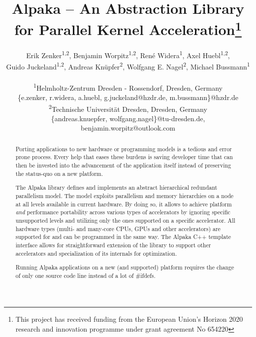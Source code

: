 \documentclass[10pt, twocolumn]{article}
\newcommand{\alpaka}{Alpaka\xspace}
\newcommand\Mark[1]{\textsuperscript#1}
\begin{document}
\title{{\alpaka} -- An Abstraction Library for Parallel Kernel Acceleration\protect\footnote{This project has received funding from the European Union’s Horizon 2020 research and innovation programme under grant agreement No 654220}}

\author{Erik Zenker\Mark{{1,2}}, Benjamin Worpitz\Mark{{1,2}}, Ren\'{e} Widera\Mark{1}, Axel Huebl\Mark{{1,2}},
  \\
  Guido Juckeland\Mark{{1,2}}, Andreas Kn\"{u}pfer\Mark{2}, Wolfgang E. Nagel\Mark{2}, Michael Bussmann\Mark{1}
  \\
  \\
  \Mark{1}Helmholtz-Zentrum Dresden - Rossendorf, Dresden, Germany\\
  \{e.zenker, r.widera, a.huebl, g.juckeland@hzdr.de, m.bussmann\}@hzdr.de
  \\
  \Mark{2}Technische Universit\"at Dresden, Dresden, Germany\\\{andreas.knuepfer, wolfgang.nagel\}@tu-dresden.de, benjamin.worpitz@outlook.com}

\maketitle

\begin{abstract}
Porting applications to new hardware or programming models is a tedious and error prone process.
Every help that eases these burdens is saving developer time that can then be invested into the advancement of the application itself instead of preserving the status-quo on a new platform.

The \alpaka library defines and implements an abstract hierarchical redundant parallelism model.
The model exploits parallelism and memory hierarchies on a node at all levels available in current hardware.
By doing so, it allows to achieve platform \emph{and} performance portability across various types of accelerators by ignoring specific unsupported
levels and utilizing only the ones supported on a specific
accelerator.
All hardware types (multi- and many-core CPUs, GPUs and other accelerators) are supported for and can be programmed in the same way.
The \alpaka C++ template interface allows for straightforward extension of the library to support other accelerators and specialization of its internals for optimization.

Running \alpaka applications on a new (and supported) platform requires the change of only one source code line instead of a lot of \#ifdefs.

\end{abstract}
\end{document}

